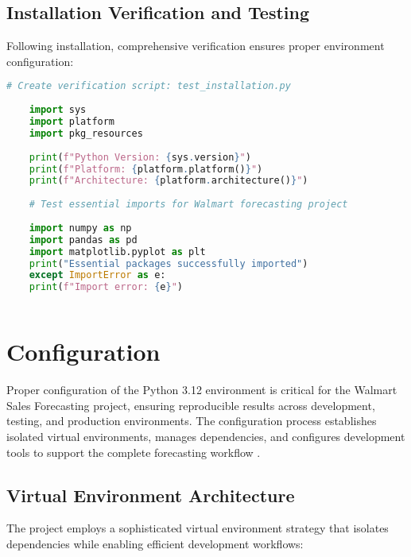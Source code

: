 \subsection{Installation Verification and Testing}

Following installation, comprehensive verification ensures proper environment configuration:

\begin{lstlisting}[language=python]
	# Create verification script: test_installation.py
	
	import sys
	import platform
	import pkg_resources
	
	print(f"Python Version: {sys.version}")
	print(f"Platform: {platform.platform()}")
	print(f"Architecture: {platform.architecture()}")
	
	# Test essential imports for Walmart forecasting project
	
	import numpy as np
	import pandas as pd
	import matplotlib.pyplot as plt
	print("Essential packages successfully imported")
	except ImportError as e:
	print(f"Import error: {e}")
	
\end{lstlisting}

\section{Configuration}

Proper configuration of the Python 3.12 environment is critical for the Walmart Sales Forecasting project, ensuring reproducible results across development, testing, and production environments. The configuration process establishes isolated virtual environments, manages dependencies, and configures development tools to support the complete forecasting workflow \cite{Montgomery:2008}.

\subsection{Virtual Environment Architecture}

The project employs a sophisticated virtual environment strategy that isolates dependencies while enabling efficient development workflows:

